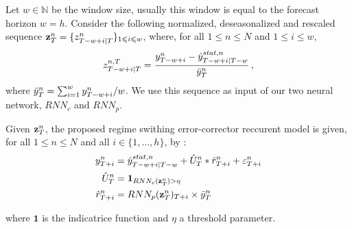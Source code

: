 \documentclass{article} %
\newcommand{\ts}{y}
\newcommand{\tspred}{\hat{\ts}}
\newcommand{\lag}{h}
\newcommand{\window}{w}
\newcommand{\meants}{\Bar{\ts}}
\newcommand{\rnnwindow}{{\bf \rnn}}
\newcommand{\rnn}{z}
\newcommand{\err}{err}
\newcommand{\threshold}{\eta}
\newcommand{\predictor}{RNN_p}
\newcommand{\classifier}{RNN_c}
\newcommand{\remainder}{r}
\newcommand{\hiddenregime}{U}
\begin{document}

Let $\window \in \mathbb{N}$ be the window size, usually this window is equal to the forecast horizon $\window = \lag$. Consider the following  normalized, deseasonalized and rescaled sequence $\rnnwindow^n_T = \{\rnn^{n}_{T-\window+i|T}\}_{1\leqslant i \leqslant w}$, where, for all $1\leqslant n \leqslant N$ and $1\leqslant i \leqslant w$, 
$$
\rnn^{n,T}_{T-w+i|T} = \frac{\ts^n_{T-w+i} -\tspred^{stat,n}_{T-w+i|T-w}}{\meants^n_T}\,,
$$
where $ \meants^n_T = \sum_{i = 1}^{w}  \ts^n_{T-w+i}/w$.
We use this sequence as input of our two neural network, $\classifier$ and $\predictor$. %

Given $\rnnwindow^n_T$, the proposed regime swithing error-corrector reccurent model is given, for all $1\leqslant n \leqslant N$ and all $i \in \{1,\ldots,\lag\}$, by :
\begin{align*}
\ts^n_{T+i}  &= \tspred^{stat,n}_{T-w+i|T-w} +  \hat{\hiddenregime}^n_T * \hat{\remainder}^{n}_{T+i} + \varepsilon^n_{T+i} \\
\hat{\hiddenregime}^n_T &= \mathbf{1}_{\classifier(\rnnwindow^n_T) > \threshold} \\
\hat{\remainder}^{n}_{T+i} &= \predictor(\rnnwindow^n_T)_{T+i} \times \meants^n_T
\end{align*}

where $\mathbf{1}$ is the indicatrice function and $\threshold$ a threshold parameter.\\
\end{document}
